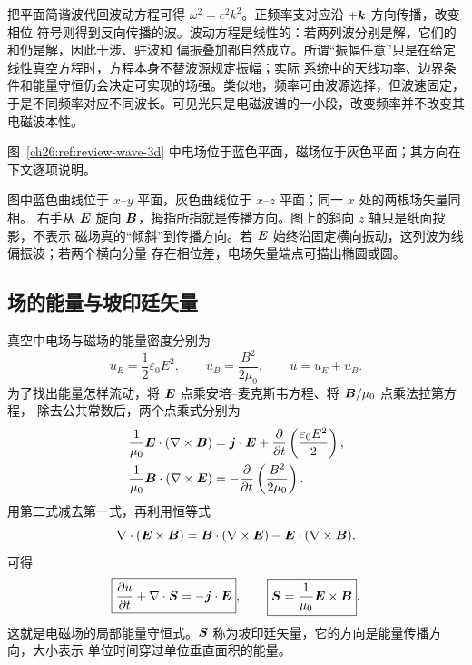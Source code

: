{把平面简谐波代回波动方程可得 $\omega^2=c^2k^2$。正频率支对应沿 $+\bm{k}$ 方向传播，改变相位
符号则得到反向传播的波。波动方程是线性的：若两列波分别是解，它们的和仍是解，因此干涉、驻波和
偏振叠加都自然成立。所谓“振幅任意”只是在给定线性真空方程时，方程本身不替波源规定振幅；实际
系统中的天线功率、边界条件和能量守恒仍会决定可实现的场强。类似地，频率可由波源选择，但波速固定，
于是不同频率对应不同波长。可见光只是电磁波谱的一小段，改变频率并不改变其电磁波本性。

图~\ref{ch26:ref:review-wave-3d} 中电场位于蓝色平面，磁场位于灰色平面；其方向在下文逐项说明。

\planeWaveThreeDDiagram

图中蓝色曲线位于 $x$--$y$ 平面，灰色曲线位于 $x$--$z$ 平面；同一 $x$ 处的两根场矢量同相。
右手从 $\bm{E}$ 旋向 $\bm{B}$，拇指所指就是传播方向。图上的斜向 $z$ 轴只是纸面投影，不表示
磁场真的“倾斜”到传播方向。若 $\bm{E}$ 始终沿固定横向振动，这列波为线偏振波；若两个横向分量
存在相位差，电场矢量端点可描出椭圆或圆。


\subsection{场的能量与坡印廷矢量}


真空中电场与磁场的能量密度分别为
\begin{equation}
  u_E=\frac12\varepsilon_0E^2,
  \qquad
  u_B=\frac{B^2}{2\mu_0},
  \qquad u=u_E+u_B.
\end{equation}
为了找出能量怎样流动，将 $\bm{E}$ 点乘安培--麦克斯韦方程、将 $\bm{B}/\mu_0$ 点乘法拉第方程，
除去公共常数后，两个点乘式分别为
\begin{align}
 \frac1{\mu_0}\bm{E}\cdot(\nabla\times\bm{B})
   &=\bm{j}\cdot\bm{E}+\frac{\partial}{\partial t}
      \left(\frac{\varepsilon_0E^2}{2}\right),\\
 \frac1{\mu_0}\bm{B}\cdot(\nabla\times\bm{E})
   &=-\frac{\partial}{\partial t}\left(\frac{B^2}{2\mu_0}\right).
\end{align}
用第二式减去第一式，再利用恒等式
\begin{equation}
  \nabla\cdot(\bm{E}\times\bm{B})
  =\bm{B}\cdot(\nabla\times\bm{E})-
  \bm{E}\cdot(\nabla\times\bm{B}),
\end{equation}
可得
\begin{equation}
  \boxed{\frac{\partial u}{\partial t}+\nabla\cdot\bm{S}=-\bm{j}\cdot\bm{E}},
  \qquad
  \boxed{\bm{S}=\frac{1}{\mu_0}\bm{E}\times\bm{B}}.
\end{equation}
这就是电磁场的局部能量守恒式。$\bm{S}$ 称为坡印廷矢量，它的方向是能量传播方向，大小表示
单位时间穿过单位垂直面积的能量。

}
